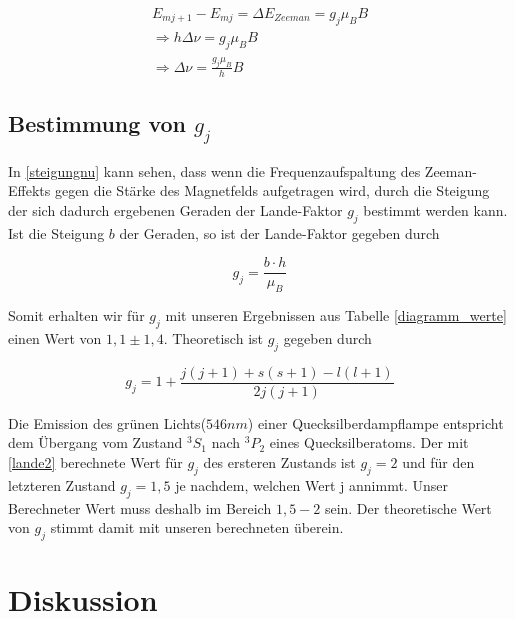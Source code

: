 \documentclass[10pt,a4paper]{article}
\begin{document}
\begin{align}
	E_{mj+1}- E_{mj} = \Delta E_{Zeeman} = g_j \mu_B B \\
	\Rightarrow h \Delta \nu =  g_j \mu_B B \\
	\Rightarrow \Delta \nu = \frac{g_j \mu_B}{h} B
	\label{steigungnu}
\end{align}

\subsection{Bestimmung von $g_j$}

In \ref{steigungnu} kann sehen, dass wenn die Frequenzaufspaltung des Zeeman-Effekts gegen die Stärke des Magnetfelds aufgetragen wird, durch die Steigung der sich dadurch ergebenen Geraden der Lande-Faktor $g_j$ bestimmt werden kann. Ist die Steigung $b$ der Geraden, so ist der Lande-Faktor gegeben durch

\begin{equation}
g_j = \frac{b \cdot h}{\mu_B}
\end{equation}

Somit erhalten wir für $g_j$ mit unseren Ergebnissen aus Tabelle \ref{diagramm_werte} einen Wert von $1,1 \pm 1,4$. Theoretisch ist $g_j$ gegeben durch

\begin{equation}
 g_j = 1 + \frac{j(j+1) + s(s+1) - l(l+1)}{2 j(j+1)}
 \label{lande2}
\end{equation}

Die Emission des grünen Lichts($546 nm$) einer Quecksilberdampflampe entspricht dem Übergang vom Zustand $^3S_1$ nach $^3P_2$ eines Quecksilberatoms. Der mit \ref{lande2} berechnete Wert für $g_j$ des ersteren Zustands ist $g_j = 2$ und für den letzteren Zustand $g_j =1,5$ je nachdem, welchen Wert j annimmt. Unser Berechneter Wert muss deshalb im Bereich $1,5-2$ sein. Der theoretische Wert von $g_j$ stimmt damit mit unseren berechneten überein.



\section{Diskussion}
\end{document}
